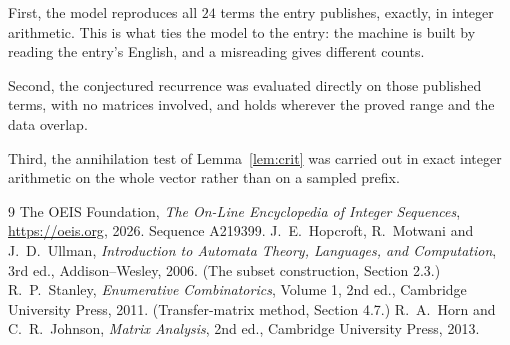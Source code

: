 \documentclass[11pt,a4paper]{article}
\theoremstyle{plain}
\theoremstyle{definition}
\begin{document}
First, the model reproduces all $24$ terms the entry publishes, exactly, in integer
arithmetic. This is what ties the model to the entry: the machine is built by reading the
entry's English, and a misreading gives different counts.

Second, the conjectured recurrence was evaluated directly on those published terms, with no
matrices involved, and holds wherever the proved range and the data overlap.

Third, the annihilation test of Lemma~\ref{lem:crit} was carried out in exact integer
arithmetic on the whole vector rather than on a sampled prefix.

\begin{thebibliography}{9}
 The OEIS Foundation, \emph{The On-Line Encyclopedia of Integer
Sequences}, \url{https://oeis.org}, 2026. Sequence A219399.
 J.~E.~Hopcroft, R.~Motwani and J.~D.~Ullman, \emph{Introduction to Automata
Theory, Languages, and Computation}, 3rd ed., Addison--Wesley, 2006. (The subset
construction, Section 2.3.)
 R.~P.~Stanley, \emph{Enumerative Combinatorics}, Volume 1, 2nd ed.,
Cambridge University Press, 2011. (Transfer-matrix method, Section 4.7.)
 R.~A.~Horn and C.~R.~Johnson, \emph{Matrix Analysis}, 2nd ed., Cambridge
University Press, 2013.
\end{thebibliography}
\end{document}
